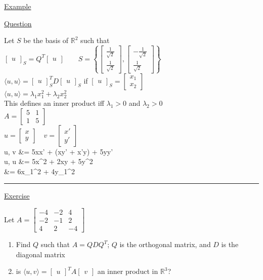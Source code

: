 \documentclass[12pt]{article}
\newcommand\m[1]{\begin{bmatrix}#1\end{bmatrix}}
\newcommand{\real}[0]{\mathbb{R}}
\newenvironment{block}[1][Label]{\underline{#1}\par}{}
\newenvironment{example}{\shownto{-,compact}\underline{Example}\par}{\divider\endshownto}
\newcommand{\bb}[1]{\left\{#1\right\}}
\newcommand{\ang}[1]{\langle#1\rangle}
\newcommand{\divider}[0]{\par\textcolor{lightgray}{\rule{\textwidth}{0.1pt}}}
\newenvironment{eqn}{\equation\alignedat{3}}{\endalignedat\endequation}
\begin{document}
\begin{example}
\begin{block}[Question]
			Let $S$ be the basis of $\real^2$ such that \\
			$\m{u}_S = Q^T \m{u} \quad \quad S = \bb{\m{\frac{1}{\sqrt{2}} \\ \frac{1}{\sqrt{2}}}, \m{-\frac{1}{\sqrt{2}} \\ \frac{1}{\sqrt{2}}}}$ \\
			$\ang{u, u} = \m{u}_S^T D \m{u}_S$ \quad if $\m{u}_S = \m{x_1 \\ x_2}$ \\
			$\ang{u, u} = \lambda_1 x_1^2 + \lambda_2 x_2^2$ \\
			This defines an inner product iff $\lambda_1 > 0$ and $\lambda_2 > 0$ \\
			$A = \m{5 & 1 \\ 1 & 5}$ \\
			$u = \m{x \\ y} \quad v = \m{x' \\ y'}$ \\
			\begin{eqn}
				\ang{u, v} &= 5xx' + (xy' + x'y) + 5yy' \\
				\ang{u, u} &= 5x^2 + 2xy + 5y^2 \\
				&= 6x_1^2 + 4y_1^2
			\end{eqn}
		\end{block}
	\end{example}

	\begin{block}[Exercise]
		Let $A = \m{-4 & -2 & 4 \\ -2 & -1 & 2 \\ 4 & 2 & -4}$ 
		\begin{enumerate}
			\item Find $Q$ such that $A = QDQ^T$; $Q$ is the orthogonal matrix, and $D$ is the diagonal matrix
			\item is $\ang{u, v} = \m{u}^T A \m{v}$ an inner product in $\real^3$?
		\end{enumerate}
	\end{block}
\end{document}
